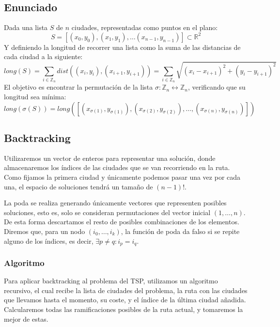 \documentclass[a4paper, 11pt]{article} %
\begin{document}
  \subsection{Enunciado}
    Dada una lista $S$ de $n$ ciudades, representadas como puntos en el plano:
    \begin{equation}
      S = [(x_0,y_0), (x_1,y_1), \dots (x_{n-1},y_{n-1})] \subset \mathbb{R}^2
    \end{equation}
    Y definiendo la longitud de recorrer una lista como la suma de las distancias de cada ciudad a la siguiente:
    \begin{equation}
     long(S) = \sum_{i \in \mathbb{Z}_n} dist((x_i,y_i), (x_{i+1}, y_{i+1})) = \sum_{i \in \mathbb{Z}_n} \sqrt{(x_i-x_{i+1})^2 + (y_i-y_{i+1})^2}
    \end{equation}
    El objetivo es encontrar la permutación de la lista $\sigma : \mathbb{Z}_n \leftrightarrow \mathbb{Z}_n$, verificando que su longitud sea mínima:
    \begin{equation}
     long(\sigma(S)) = long([(x_{\sigma(1)},y_{\sigma(1)}), (x_{\sigma(2)},y_{\sigma(2)}), \dots, (x_{\sigma(n)},y_{\sigma(n)})])
    \end{equation}
    
  \subsection{Backtracking}
  
  
  Utilizaremos un vector de enteros para representar una solución, donde almacenaremos los índices de las ciudades que se van recorriendo en la ruta. Como fijamos la primera ciudad y únicamente podemos pasar una vez por cada una, el espacio de soluciones tendrá un tamaño de $(n-1)!$.
  
  La poda se realiza generando únicamente vectores que representen posibles soluciones, esto es, solo se consideran permutaciones del vector inicial $(1,\dots,n)$. De esta forma descartamos el resto de posibles combinaciones de los elementos. Diremos que, para un nodo $(i_0, \dots, i_k)$, la función de poda da falso si se repite alguno de los índices, es decir, $\exists p\ne q : i_p = i_q$.
  
  
      \newpage
      
    \subsubsection{Algoritmo}
    
      Para aplicar backtracking al problema del TSP, utilizamos un algoritmo recursivo, el cual recibe la lista de 
      ciudades del problema, la ruta con las ciudades que llevamos hasta el momento, su coste, y el índice de la 
      última ciudad añadida. Calcularemos todas las ramificaciones posibles de la ruta actual, y tomaremos la mejor 
      de estas. 
  
\end{document}
